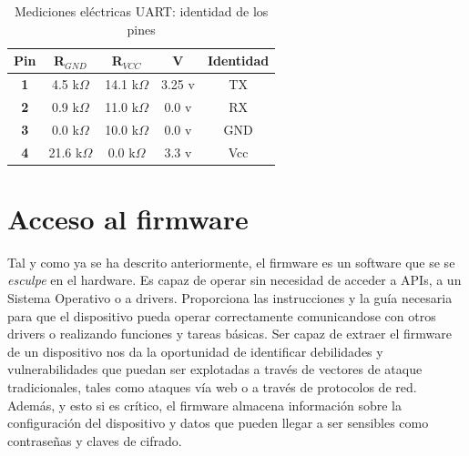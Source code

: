 \documentclass[12pt,a4paper, brazil]{article}
\begin{document}
\begin{table}[htpb]
\centering
\caption{Mediciones eléctricas UART: identidad de los pines}
\label{tab:my-table}
\begin{tabular}{@{}ccccc@{}}
\toprule
{\color[HTML]{FE0000} \textbf{Pin}} & {\color[HTML]{FE0000} \textbf{R$_{GND}$}}                 & {\color[HTML]{FE0000} \textbf{R$_{VCC}$}}                 & {\color[HTML]{FE0000} \textbf{V}} & \multicolumn{1}{l}{{\color[HTML]{3166FF} \textbf{Identidad}}} \\ \midrule
\multicolumn{1}{|c|}{\textbf{1}}    & \multicolumn{1}{c|}{4.5 k$\Omega$}                        & \multicolumn{1}{c|}{14.1 k$\Omega$}                       & \multicolumn{1}{c|}{3.25 v}       & \multicolumn{1}{c|}{TX}                                       \\ \midrule
\multicolumn{1}{|c|}{\textbf{2}}    & \multicolumn{1}{c|}{0.9 k$\Omega$}                        & \multicolumn{1}{c|}{11.0 k$\Omega$}                       & \multicolumn{1}{c|}{0.0 v}        & \multicolumn{1}{c|}{RX}                                       \\ \midrule
\multicolumn{1}{|c|}{\textbf{3}}    & \multicolumn{1}{c|}{{\color[HTML]{FE0000} 0.0 k$\Omega$}} & \multicolumn{1}{c|}{10.0 k$\Omega$}                       & \multicolumn{1}{c|}{0.0 v}        & \multicolumn{1}{c|}{GND}                                      \\ \midrule
\multicolumn{1}{|c|}{\textbf{4}}    & \multicolumn{1}{c|}{21.6 k$\Omega$}                       & \multicolumn{1}{c|}{{\color[HTML]{FE0000} 0.0 k$\Omega$}} & \multicolumn{1}{c|}{3.3 v}        & \multicolumn{1}{c|}{Vcc}                                      \\ \bottomrule
\end{tabular}
\end{table}

\section{Acceso al firmware}
Tal y como ya se ha descrito anteriormente, el firmware es un software que se se \emph{esculpe} en el hardware. Es capaz de operar sin necesidad de acceder a APIs, a un Sistema Operativo o a drivers. Proporciona las instrucciones y la guía necesaria para que el dispositivo pueda operar correctamente comunicandose con otros drivers o realizando funciones y tareas básicas. Ser capaz de extraer el firmware de un dispositivo nos da la oportunidad de identificar debilidades y vulnerabilidades que puedan ser explotadas a través de vectores de ataque tradicionales, tales como ataques vía web o a través de protocolos de red. Además, y esto si es crítico, el firmware almacena información sobre la configuración del dispositivo y datos que pueden llegar a ser sensibles como contraseñas y claves de cifrado. 
\end{document}
